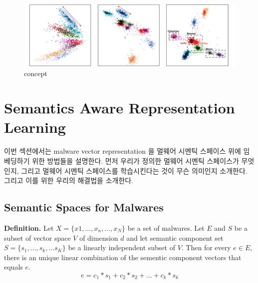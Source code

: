 \begin{figure}[!htb] %
  \includegraphics[width=\textwidth]{../figures/concept.pdf}
  \caption{concept}
  \label{fig:concept}
\end{figure}




\section{Semantics Aware Representation Learning}
이번 섹션에서는 malware vector representation 을 멀웨어 시멘틱 스페이스 위에 임베딩하기 위한 방법들을 설명한다. 먼저 우리가 정의한 멀웨어 시멘틱 스페이스가 무엇인지, 그리고 멀웨어 시멘틱 스페이스를 학습시킨다는 것이 무슨 의미인지 소개한다. 그리고 이를 위한 우리의 해결법을 소개한다. 



\subsection{Semantic Spaces for Malwares}
%
%
%



\textbf{Definition. }
Let $X = \{x1, …, x_n, …, x_N\}$ be a set of malwares.
Let $E$ and $S$ be a subset of vector space $V$ of dimension $d$ and let semantic component set $S = \{s_1, ... , s_k, … s_K\}$ be a linearly independent subset of $V$.  
Then for every $e \in E$, there is an unique linear combination of the sementic component vectors that equals $e$.
\[
e = c_1*s_1 + c_2*s_2 + … + c_k*s_k 
\]

